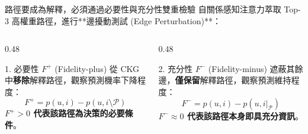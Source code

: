 \documentclass[aspectratio=169, 10pt]{beamer}
\begin{document}
\begin{frame}{路徑要成為解釋，必須通過必要性與充分性雙重檢驗}
  自關係感知注意力萃取 Top-3 高權重路徑，進行**邊擾動測試 (Edge Perturbation)**：
  
  \begin{columns}[T]
    \begin{column}{0.48\textwidth}
      \begin{block}{1. 必要性 $F^+$ (Fidelity-plus)}
        從 CKG 中\textbf{移除}解釋路徑，觀察預測機率下降程度：
        \[
        F^+ = p(u,i) - p(u,i \setminus \mathcal{P})
        \]
        \textbf{$F^+ > 0$ 代表該路徑為決策的必要條件}。
      \end{block}
    \end{column}
    
    \begin{column}{0.48\textwidth}
      \begin{block}{2. 充分性 $F^-$ (Fidelity-minus)}
        遮蔽其餘邊，\textbf{僅保留}解釋路徑，觀察預測維持程度：
        \[
        F^- = p(u,i) - p(u,i|_{\mathcal{P}})
        \]
        \textbf{$F^- \approx 0$ 代表該路徑本身即具充分資訊}。
      \end{block}
    \end{column}
  \end{columns}
\end{frame}
\end{document}
